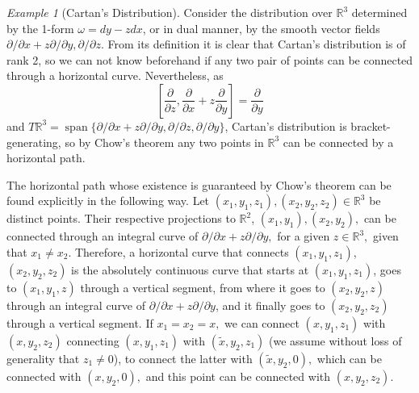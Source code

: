 \documentclass[12pt, letterpaper, reqno]{amsart}
\theoremstyle{definition}
\theoremstyle{plain}
\theoremstyle{remark}
\newtheorem{ex}{Example}
\begin{document}
\begin{ex}[Cartan's Distribution]\label{ex:cartan_distribution}
	Consider the distribution over $ \mathbb{R}^3 $ determined by the 1-form $\omega =dy- zdx $, or in dual manner, by the smooth vector fields $ \partial /\partial x + z \partial / \partial y, \partial/\partial z. $ From its definition it is clear that Cartan's distribution is of rank 2, so we can not know beforehand if any two pair of points can be connected through a horizontal curve. Nevertheless, as 
	$$ \left[ \frac{\partial}{\partial z}, \frac{\partial}{\partial x}+z \frac{\partial}{\partial y}    \right] = \frac{\partial}{\partial y}  $$ 
	and $ T \mathbb{R}^3 = \operatorname{span}\{  \partial/\partial x + z \partial / \partial y, \partial/\partial z, \partial/\partial y\} $, Cartan's distribution is bracket-generating, so by Chow's theorem any two points in $ \mathbb{R}^3 $ can be connected by a horizontal path.

	The horizontal path whose existence is guaranteed by Chow's theorem can be found explicitly in the following way. Let $ (x_1,y_1,z_1), (x_2,y_2,z_2)\in \mathbb{R}^3 $ be distinct points. Their respective projections to $ \mathbb{R}^2 $, $(x_1, y_1), (x_2,y_2),$ can be connected through an integral curve of $ \partial/\partial x+ z\partial/\partial y, $ for a given $ z\in \mathbb{R}^3, $ given that $ x_1\neq x_2. $  Therefore, a horizontal curve that connects $  (x_1,y_1,z_1)$, $(x_2,y_2,z_2)$ is the absolutely continuous curve that starts at $ (x_1,y_1,z_1) $, goes to $ (x_1,y_1,z) $ through a vertical segment, from where it goes to $(x_2,y_2,z)  $ through an integral curve of $ \partial/\partial x+ z \partial/\partial y $, and it finally goes to $ (x_2,y_2,z_2) $ through a vertical segment. If $ x_1=x_2=x, $ we can connect $ (x,y_1,z_1) $ with $ (x,y_2,z_2) $ connecting $(x, y_1,z_1)$ with $ (\tilde x, y_2, z_1) $ (we assume without loss of generality that $ z_1\neq 0 $), to connect the latter with $ (\tilde x, y_2, 0), $ which can be connected with $ (x, y_2, 0), $ and this point can be connected with $ (x, y_2,z_2). $     
\end{ex}
\end{document}
